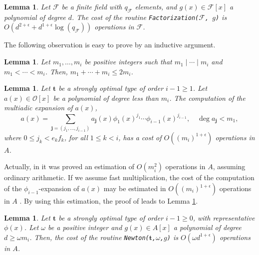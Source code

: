 \documentclass{amsart}
\newtheorem{lemma}[theorem]{Lemma}
\begin{document}
\begin{lemma}{\cite[Cor. 14.30]{vzGG}}\label{Factorization}
Let $\mathcal{F}$ be a finite field with $q_{\mathcal{F}}$ elements, and $g(x)\in \mathcal{F}[x]$ a polynomial of degree $d$. The cost of the routine {\tt Factorization($\mathcal{F}$,\,$g$)} is $O\left(d^{2+\epsilon}+d^{1+\epsilon}\log(q_{\mathcal{F}})\right)$ operations in $\mathcal{F}$. 
\end{lemma}

The following observation is easy to prove by an inductive argument.

\begin{lemma}\label{trivial}
Let $m_1,\dots,m_i$ be positive integers such that $m_1\mid \cdots \mid m_i$ and $m_1<\cdots<m_i$. Then, $m_1+\cdots +m_i\le 2m_i$. 
\end{lemma}

\begin{lemma}\cite[Lem. 18]{pauli}\label{phiadic}
Let ${\mathbf{t}}$ be a strongly optimal type of order $i-1\ge1$. 
Let $a(x)\in{\mathcal{O}}[x]$ be a polynomial of degree less than $m_{i}$. The computation of the multiadic expansion of $a(x)$,
\begin{equation}\label{multiadic}
a(x)=\sum_{{\mathbf{j}}=(j_1,\dots,j_{i-1})} a_{\mathbf{j}}(x)\phi_1(x)^{j_1}\cdots \phi_{i-1}(x)^{j_{i-1}},\quad \deg a_{\mathbf{j}}<m_1,
\end{equation}
where $0\le j_k<e_k f_k$, for all $1\le k< i$, has a cost of $O((m_{i})^{1+\epsilon})$ operations in $A$.
\end{lemma}

Actually, in \cite{pauli} it was proved an estimation of $O(m_i^2)$ operations in $A$, assuming ordinary arithmetic. If we assume fast multiplication, the cost of the computation of the $\phi_{i-1}$-expansion of $a(x)$ may be estimated in $O((m_{i})^{1+\epsilon})$ operations in $A$ \cite[Thm. 9.15]{vzGG}. By using this estimation, the proof of \cite[Lem. 18]{pauli} leads to Lemma \ref{phiadic}.

\begin{lemma}\label{Newton}
Let ${\mathbf{t}}$ be a strongly optimal type of order $i-1\ge0$, with representative $\phi(x)$. Let $\omega$ be a positive integer and $g(x)\in A[x]$ a polynomial of degree $d\ge \omega m_i$. Then, the cost of the routine {\tt Newton(${\mathbf{t}}$,$\omega$,$g$)} is $O(\omega d^{1+\epsilon})$ operations in $A$.
\end{lemma}
\end{document}
